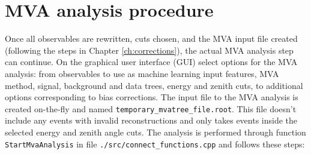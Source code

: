 \documentclass[12pt,a4paper]{report}
\begin{document}
\chapter{MVA analysis procedure}
Once all observables are rewritten, cuts chosen, and the MVA input file created (following the steps in Chapter \ref{ch:corrections}), the actual MVA analysis step can continue. On the graphical user interface (GUI) select options for the MVA analysis: from observables to use as machine learning input features, MVA method, signal, background and data trees, energy and zenith cuts, to additional options corresponding to bias corrections. The input file to the MVA analysis is created on-the-fly and named \texttt{temporary\_mvatree\_file.root}. This file doesn't include any events with invalid reconstructions and only takes events inside the selected energy and zenith angle cuts. The analysis is performed through function \texttt{StartMvaAnalysis} in file \texttt{./src/connect\_functions.cpp} and follows these steps:
\end{document}
